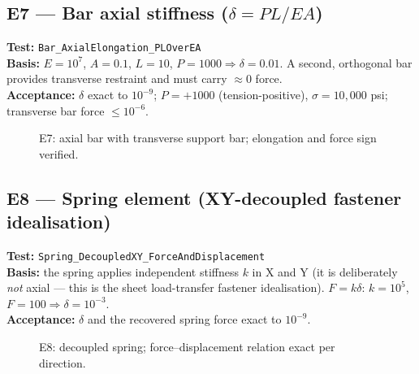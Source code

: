 \documentclass[11pt,a4paper]{article}
\newcommand{\pin}[2]{%
  \draw[thick,fill=cyan!60!black] (#1,#2) -- (#1-0.13,#2-0.22) -- (#1+0.13,#2-0.22) -- cycle;
  \draw[thick] (#1-0.2,#2-0.26) -- (#1+0.2,#2-0.26);
}
\begin{document}
\subsection{E7 --- Bar axial stiffness ($\delta = PL/EA$)}
\textbf{Test:} \texttt{Bar\_AxialElongation\_PLOverEA}\\
\textbf{Basis:} $E=10^7$, $A=0.1$, $L=10$, $P=1000 \Rightarrow \delta = 0.01$.
A second, orthogonal bar provides transverse restraint and must carry
$\approx 0$ force.\\
\textbf{Acceptance:} $\delta$ exact to $10^{-9}$; $P=+1000$ (tension-positive),
$\sigma = 10{,}000$ psi; transverse bar force $\le 10^{-6}$.

\begin{figure}[H]\centering
{}
\caption{E7: axial bar with transverse support bar; elongation and force sign verified.}
\end{figure}

\subsection{E8 --- Spring element (XY-decoupled fastener idealisation)}
\textbf{Test:} \texttt{Spring\_DecoupledXY\_ForceAndDisplacement}\\
\textbf{Basis:} the spring applies independent stiffness $k$ in X and Y (it is
deliberately \emph{not} axial --- this is the sheet load-transfer fastener
idealisation). $F = k\delta$: $k=10^5$, $F=100 \Rightarrow \delta = 10^{-3}$.\\
\textbf{Acceptance:} $\delta$ and the recovered spring force exact to $10^{-9}$.

\begin{figure}[H]\centering
{}
\caption{E8: decoupled spring; force--displacement relation exact per direction.}
\end{figure}
\end{document}
